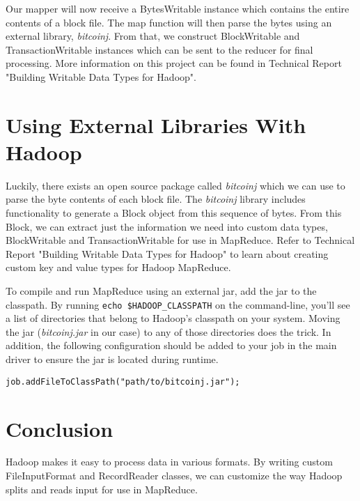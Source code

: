 \documentclass[9pt,twocolumn,twoside]{idsi}
\begin{document}
Our mapper will now receive a BytesWritable instance which contains the entire contents of a block file. The map function will then parse the bytes using an external library, \emph{bitcoinj}. From that, we construct BlockWritable and TransactionWritable instances which can be sent to the reducer for final processing. More information on this project can be found in Technical Report "Building Writable Data Types for Hadoop".

\section{Using External Libraries With Hadoop}

Luckily, there exists an open source package called \emph{bitcoinj} which we can use to parse the byte contents of each block file. The \emph{bitcoinj} library includes functionality to generate a Block object from this sequence of bytes. From this Block, we can extract just the information we need into custom data types, BlockWritable and TransactionWritable for use in MapReduce. Refer to Technical Report "Building Writable Data Types for Hadoop" to learn about creating custom key and value types for Hadoop MapReduce.

To compile and run MapReduce using an external jar, add the jar to the classpath. By running \lstinline{echo $HADOOP_CLASSPATH} on the command-line, you'll see a list of directories that belong to Hadoop's classpath on your system. Moving the jar (\emph{bitcoinj.jar} in our case) to any of those directories does the trick. In addition, the following configuration should be added to your job in the main driver to ensure the jar is located during runtime.

\begin{lstlisting}
job.addFileToClassPath("path/to/bitcoinj.jar");
\end{lstlisting}

\section{Conclusion}
Hadoop makes it easy to process data in various formats. By writing custom FileInputFormat and RecordReader classes, we can customize the way Hadoop splits and reads input for use in MapReduce.
\end{document}
